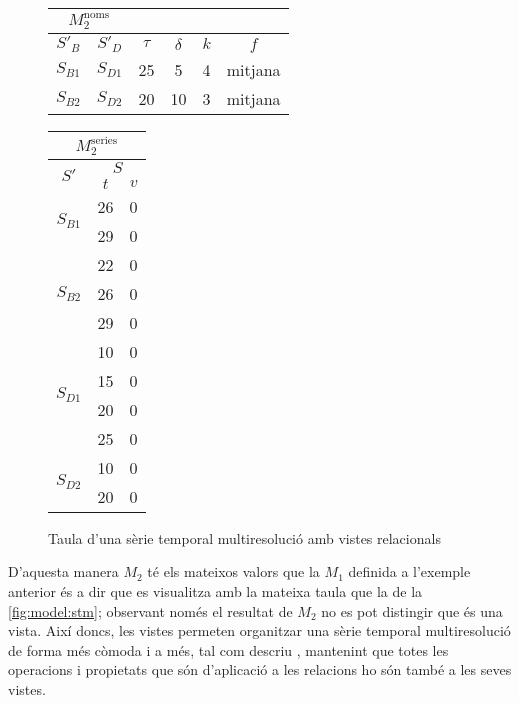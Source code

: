\begin{example} 
  \begin{figure}[tp]
    \centering
    \begin{tabular}{|c|c|c|c|c|c|}
      \multicolumn{2}{c}{$M_2^{\text{noms}}$} \\ \hline
      $S'_B$  & $S'_D$ & $\tau$ & $\delta$ & $k$ & $f$ \\ \hline
      $S_{B1}$ & $S_{D1}$ & 25 & 5  & 4 & mitjana  \\
      $S_{B2}$ & $S_{D2}$ & 20 & 10 & 3 & mitjana  \\ \hline
    \end{tabular}\qquad
    \begin{tabular}{|c|c|c|}
      \multicolumn{3}{c}{$M^{\text{series}}_{2}$} \\ \hline
      \multirow{2}{*}{$S'$}  &  \multicolumn{2}{c|}{$S$} \\ \cline{2-3}
      & $t$      & $v$  \\ \hline
      \multirow{2}{*}{$S_{B1}$} 
      & 26 & 0 \\ 
      & 29 & 0 \\ \hline
      \multirow{3}{*}{$S_{B2}$} 
      & 22 & 0 \\ 
      & 26 & 0 \\ 
      & 29 & 0 \\ \hline
      \multirow{4}{*}{$S_{D1}$} 
      & 10 & 0 \\ 
      & 15 & 0 \\ 
      & 20 & 0 \\ 
      & 25 & 0 \\ \hline
      \multirow{2}{*}{$S_{D2}$} 
      & 10 & 0 \\ 
      & 20 & 0 \\ \hline
    \end{tabular}
    \caption{Taula d'una sèrie temporal multiresolució amb vistes
      relacionals}
    \label{fig:model:stm:vistes}
  \end{figure}


  D'aquesta manera $M_2$ té els mateixos valors que la $M_1$ definida
  a l'exemple anterior és a dir que es visualitza amb la mateixa taula
  que la de la \autoref{fig:model:stm}; observant només el resultat de
  $M_2$ no es pot distingir que és una vista. Així doncs, les vistes
  permeten organitzar una sèrie temporal multiresolució de forma més
  còmoda i a més, tal com descriu \textcite{date13}, mantenint que
  totes les operacions i propietats que són d'aplicació a les
  relacions ho són també a les seves vistes.





\end{example}


